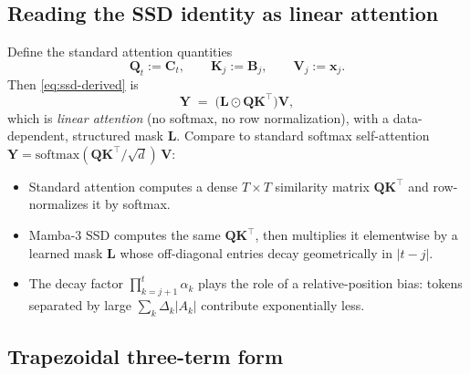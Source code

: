 \documentclass[11pt,a4paper]{article}
\begin{document}
\subsection{Reading the SSD identity as linear attention}

Define the standard attention quantities
\begin{equation}
  \bm{Q}_t := \bm{C}_t,\qquad \bm{K}_j := \bm{B}_j,\qquad \bm{V}_j := \bm{x}_j.
\end{equation}
Then \eqref{eq:ssd-derived} is
\begin{equation}\label{eq:attn}
  \bm{Y} \;=\; \bigl(\bm{L}\odot \bm{Q}\bm{K}^\top\bigr)\bm{V},
\end{equation}
which is \emph{linear attention} (no softmax, no row normalization),
with a data-dependent, structured mask $\bm{L}$. Compare to standard
softmax self-attention
$\bm{Y} = \mathrm{softmax}(\bm{Q}\bm{K}^\top / \sqrt{d})\,\bm{V}$:
\begin{itemize}
  \item Standard attention computes a dense $T\times T$ similarity
        matrix $\bm{Q}\bm{K}^\top$ and row-normalizes it by softmax.
  \item Mamba-3 SSD computes the same $\bm{Q}\bm{K}^\top$, then
        multiplies it elementwise by a learned mask $\bm{L}$ whose
        off-diagonal entries decay geometrically in $|t-j|$.
  \item The decay factor $\prod_{k=j+1}^{t}\alpha_k$ plays the role of
        a relative-position bias: tokens separated by large
        $\sum_{k}\Delta_k |A_k|$ contribute exponentially less.
\end{itemize}

\subsection{Trapezoidal three-term form}\label{sec:trap}
\end{document}
